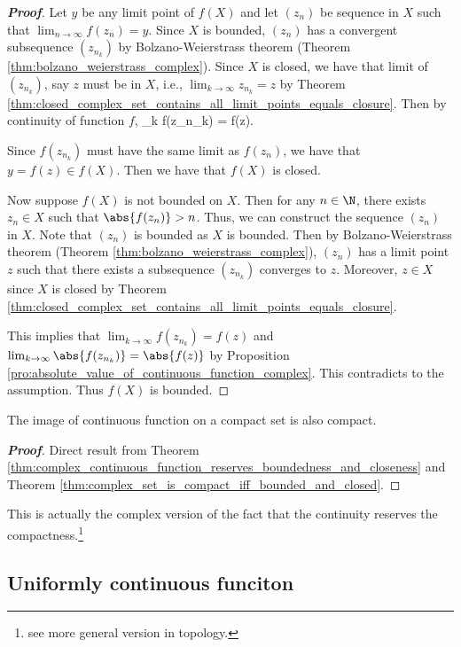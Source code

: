 \begin{proof}[\bf Proof]
Let $y$ be any limit point of $f(X)$ and let $(z_n)$ be sequence in $X$ such that $\lim_{n\to \infty}f(z_n) = y$. Since $X$ is bounded, $(z_n)$ has a convergent subsequence $(z_{n_k})$ by Bolzano-Weierstrass theorem (Theorem \ref{thm:bolzano_weierstrass_complex}). Since $X$ is closed, we have that limit of $(z_{n_k})$, say $z$ must be in $X$, i.e., $\lim_{k\to \infty} z_{n_k} = z$ by Theorem \ref{thm:closed_complex_set_contains_all_limit_points_equals_closure}. Then by continuity of function $f$,
\be
\lim_{k\to \infty} f(z_{n_k}) = f(z).
\ee

Since $f(z_{n_k})$ must have the same limit as $f(z_n)$, we have that $y = f(z) \in f(X)$. Then we have that $f(X)$ is closed.

Now suppose $f(X)$ is not bounded on $X$. Then for any $n\in \N$, there exists $z_n\in X$ such that $\abs{f(z_n)} > n$. Thus, we can construct the sequence $(z_n)$ in $X$. Note that $(z_n)$ is bounded as $X$ is bounded. Then by Bolzano-Weierstrass theorem (Theorem \ref{thm:bolzano_weierstrass_complex}), $(z_n)$ has a limit point $z$ such that there exists a subsequence $(z_{n_k})$ converges to $z$. Moreover, $z\in X$ since $X$ is closed by Theorem \ref{thm:closed_complex_set_contains_all_limit_points_equals_closure}.

This implies that $\lim_{k\to \infty}f(z_{n_k}) = f(z)$ and $\lim_{k\to \infty}\abs{f(z_{n_k})} = \abs{f(z)}$ by Proposition \ref{pro:absolute_value_of_continuous_function_complex}. This contradicts to the assumption. Thus $f(X)$ is bounded.
\end{proof}


\begin{corollary}
The image of continuous function on a compact set is also compact.
\end{corollary}

\begin{proof}[\bf Proof]
Direct result from Theorem \ref{thm:complex_continuous_function_reserves_boundedness_and_closeness} and Theorem \ref{thm:complex_set_is_compact_iff_bounded_and_closed}.
\end{proof}

\begin{remark}
This is actually the complex version of the fact that the continuity reserves the compactness.\footnote{see more general version in topology.}
\end{remark}


\subsection{Uniformly continuous funciton}

